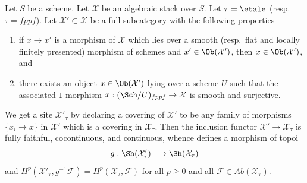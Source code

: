 %
\begin{lemma}
\label{lemma-cohomology-on-subcategory}
Let $S$ be a scheme. Let $\mathcal{X}$ be an algebraic stack over $S$.
Let $\tau = \etale$ (resp.\ $\tau = fppf$). Let
$\mathcal{X}' \subset \mathcal{X}$ be a full subcategory with the
following properties
\begin{enumerate}
\item if $x \to x'$ is a morphism of $\mathcal{X}$ which lies over a
smooth (resp.\ flat and locally finitely presented) morphism of
schemes and $x' \in \Ob(\mathcal{X}')$, then $x \in \Ob(\mathcal{X}')$, and
\item there exists an object $x \in \Ob(\mathcal{X}')$ lying over
a scheme $U$ such that the associated $1$-morphism
$x : (\Sch/U)_{fppf} \to \mathcal{X}$ is smooth and surjective.
\end{enumerate}
We get a site $\mathcal{X}'_\tau$ by declaring a covering of $\mathcal{X}'$
to be any family of morphisms $\{x_i \to x\}$ in $\mathcal{X}'$ which is a
covering in $\mathcal{X}_\tau$. Then the inclusion functor
$\mathcal{X}' \to \mathcal{X}_\tau$ is fully faithful, cocontinuous, and
continuous, whence defines a morphism of topoi
$$
g : \Sh(\mathcal{X}'_\tau) \longrightarrow \Sh(\mathcal{X}_\tau)
$$
and $H^p(\mathcal{X}'_\tau, g^{-1}\mathcal{F}) =
H^p(\mathcal{X}_\tau, \mathcal{F})$ for all $p \geq 0$ and all
$\mathcal{F} \in \textit{Ab}(\mathcal{X}_\tau)$.
\end{lemma}

